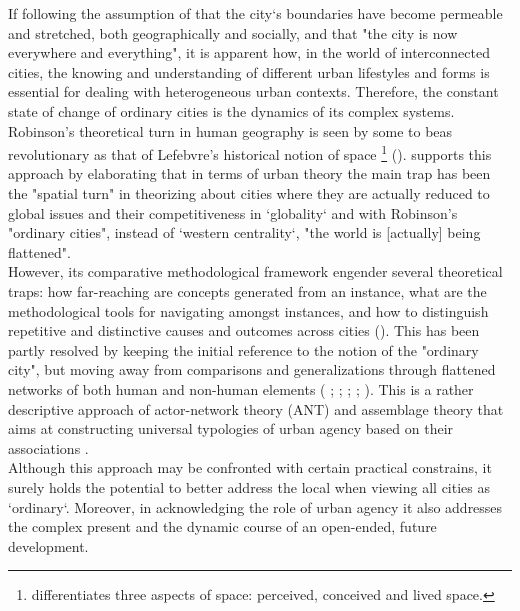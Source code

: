 \documentclass[11pt]{report}
\begin{document}
{{{If following the assumption of \href{Amin}{\citealt{amin_globalization_1996}} that the city‘s boundaries have become permeable and stretched, both geographically and socially, and that "the city is  now  everywhere  and  everything", it is apparent how, in the world of interconnected cities, the knowing and understanding of different urban lifestyles and forms is essential for dealing with heterogeneous urban contexts. Therefore, the constant state of change of ordinary cities is the dynamics of its complex systems. 
\\

Robinson's theoretical turn in human geography is seen by some to beas revolutionary as that of Lefebvre's historical notion of space
\footnote{\href{Lefebvre}{\cite{lefebvre_production_1974}}
differentiates  three aspects of space: perceived, conceived and lived space.}
(\href{Chapelin}{\citealt{gintrac_les_2014}}).
\cite{fraser_globalization_2006} supports this approach by elaborating that  in  terms  of  urban  theory  the  main  trap  has  been  the "spatial  turn"  in  theorizing  about  cities  where  they  are  actually  reduced  to  global  issues  and  their competitiveness  in  ‘globality‘ and with Robinson's "ordinary cities", instead of ‘western centrality‘, "the world is [actually] being flattened".
\\

However, its comparative methodological framework engender several theoretical traps: how far-reaching are concepts generated from an instance, what are the methodological tools for navigating amongst instances, and how to distinguish repetitive and distinctive causes and outcomes across cities (\href{Robinson}{\citealt{robinson_comparative_2015}}).
This has been partly resolved by keeping the initial reference to the notion of the "ordinary city", but moving away from comparisons and generalizations through flattened networks of both human and non-human elements
( \href{Robinson}{\citealt{Robinson2004}};
\href{Sassen}{\cite{Sassen2008}}; \href{McFarlane}{\cite{McFarlane2010}}; \href{Farias}{\citealt{farias_introduction:_2011}}; \href{Rankin}{\citealt{rankin_assemblage_2011}}).
This is a rather descriptive approach of actor-network theory (ANT) and assemblage theory that aims at constructing universal typologies of urban agency based on their associations \href{Scott}{\citealt{scott_nature_2015}}.
\\

Although this approach may  be  confronted  with  certain practical constrains, it surely holds the potential to better address the local when viewing all cities as ‘ordinary‘. Moreover, in acknowledging the role of urban agency it also addresses the complex present and the dynamic course of an open-ended, future development. 

}}}
\end{document}
